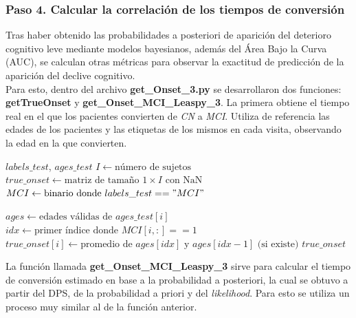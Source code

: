 \subsubsection{Paso 4. Calcular la correlación de los tiempos de conversión}
Tras haber obtenido las probabilidades a posteriori de aparición del deterioro cognitivo leve mediante modelos bayesianos, además del Área Bajo la Curva (AUC), se calculan otras métricas para observar la exactitud de predicción de la aparición del declive cognitivo. \\

Para esto, dentro del archivo \textbf{get\_Onset\_3.py} se desarrollaron dos funciones: \textbf{getTrueOnset} y \textbf{get\_Onset\_MCI\_Leaspy\_3}. La primera obtiene el tiempo real en el que los pacientes convierten de \textit{CN} a \textit{MCI}. Utiliza de referencia las edades de los pacientes y las etiquetas de los mismos en cada visita, observando la edad en la que convierten.

\begin{algorithm}
	\caption{Calcular Edad Real de Inicio de MCI}
	\begin{algorithmic}[1]
		\REQUIRE $labels\_test$, $ages\_test$
		\STATE $I \gets \text{número de sujetos}$
		\STATE $true\_onset \gets \text{matriz de tamaño } 1 \times I \text{ con NaN}$
		\STATE $MCI \gets \text{binario donde } labels\_test == "MCI"$
		
		\STATE $ages \gets \text{edades válidas de } ages\_test[i]$
		\STATE $idx \gets \text{primer índice donde } MCI[i,:] == 1$
		\STATE $true\_onset[i] \gets \text{promedio de } ages[idx] \text{ y } ages[idx-1] \text{ (si existe)}$
		\ENDIF
		\ENDFOR
		\RETURN $true\_onset$
	\end{algorithmic}
\end{algorithm}

La función llamada \textbf{get\_Onset\_MCI\_Leaspy\_3} sirve para calcular el tiempo de conversión estimado en base a la probabilidad a posteriori, la cual se obtuvo a partir del DPS, de la probabilidad a priori y del \textit{likelihood}. Para esto se utiliza un proceso muy similar al de la función anterior.\\

